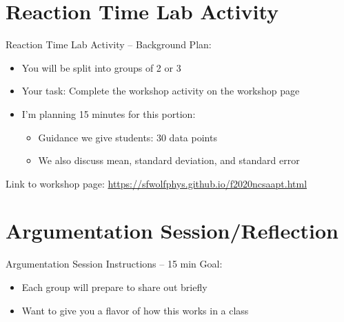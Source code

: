 \documentclass[xcolor=dvipsnames,table]{beamer}
\begin{document}
\section{Reaction Time Lab Activity}
\begin{frame}{Reaction Time Lab Activity -- Background}
  Plan:
  \begin{itemize}
    \item You will be split into groups of 2 or 3
    \item Your task: Complete the workshop activity on the workshop page
    \item I'm planning 15 minutes for this portion:
    \begin{itemize}
      \item Guidance we give students: 30 data points
      \item We also discuss mean, standard deviation, and standard error
    \end{itemize}
  \end{itemize}

  Link to workshop page:  \url{https://sfwolfphys.github.io/f2020ncsaapt.html}
\end{frame}


\section{Argumentation Session/Reflection}
\begin{frame}{Argumentation Session Instructions -- 15 min}
  Goal:
  \begin{itemize}
    \item Each group will prepare to share out briefly
    \item Want to give you a flavor of how this works in a class
  \end{itemize}
\end{frame}
\end{document}
